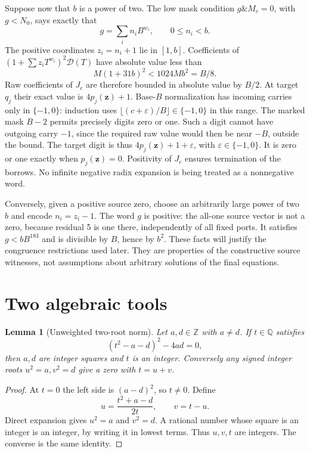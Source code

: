 \documentclass[11pt,a4paper]{article}
\newtheorem{lemma}[theorem]{Lemma}
\theoremstyle{definition}\newtheorem{definition}[theorem]{Definition}
\theoremstyle{remark}\newtheorem{remark}[theorem]{Remark}
\newcommand{\Z}{\mathbb Z}\newcommand{\N}{\mathbb N}\newcommand{\Pos}{\mathbb Z_{>0}}
\begin{document}
Suppose now that $b$ is a power of two. The low mask condition
$g\mathbin{\&}M_c=0$, with $g<N_0$, says exactly that
\[
 g=\sum_i n_iB^{w_i},\qquad 0\le n_i<b.
\]
The positive coordinates $z_i=n_i+1$ lie in $[1,b]$. Coefficients of
$(1+\sum z_iT^{w_i})^2\mathcal D(T)$ have absolute value less than
\[
 M(1+31b)^2<1024Mb^2=B/8.
\]
Raw coefficients of $J_c$ are therefore bounded in absolute value by
$B/2$. At target $q_j$ their exact value is $4p_j(\mathbf z)+1$.
Base-$B$ normalization has incoming carries only in $\{-1,0\}$: induction
uses $\lfloor(c+\varepsilon)/B\rfloor\in\{-1,0\}$ in this range.
The marked mask $B-2$ permits precisely digits zero or one. Such a digit
cannot have outgoing carry $-1$, since the required raw value would then
be near $-B$, outside the bound. The target digit is thus
$4p_j(\mathbf z)+1+\varepsilon$, with $\varepsilon\in\{-1,0\}$.
It is zero or one exactly when $p_j(\mathbf z)=0$. Positivity of $J_c$
ensures termination of the borrows. No infinite negative radix expansion
is being treated as a nonnegative word.

Conversely, given a positive source zero, choose an arbitrarily large
power of two $b$ and encode $n_i=z_i-1$. The word $g$ is positive:
the all-one source vector is not a zero, because residual 5 is one there,
independently of all fixed ports. It satisfies $g<bB^{183}$ and is divisible
by $B$, hence by $b^2$. These facts will justify the congruence restrictions
used later. They are properties of the constructive source witnesses, not
assumptions about arbitrary solutions of the final equations.

\section{Two algebraic tools}\label{sec:tools}

\begin{lemma}[Unweighted two-root norm]\label{lem:norm}
Let $a,d\in\Z$ with $a\ne d$. If $t\in\mathbb Q$ satisfies
\[
 (t^2-a-d)^2-4ad=0,
\]
then $a,d$ are integer squares and $t$ is an integer. Conversely any signed
integer roots $u^2=a,v^2=d$ give a zero with $t=u+v$.
\end{lemma}
\begin{proof}
At $t=0$ the left side is $(a-d)^2$, so $t\ne0$. Define
\[
 u=\frac{t^2+a-d}{2t},\qquad v=t-u.
\]
Direct expansion gives $u^2=a$ and $v^2=d$. A rational number whose square
is an integer is an integer, by writing it in lowest terms. Thus
$u,v,t$ are integers. The converse is the same identity.
\end{proof}
\end{document}
